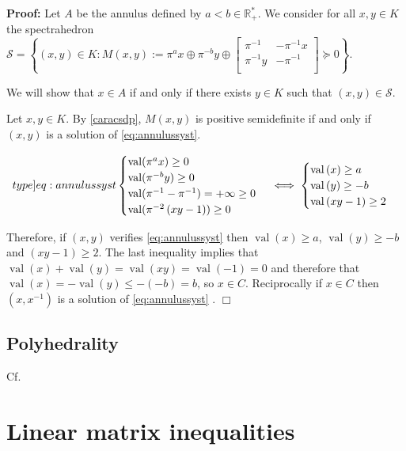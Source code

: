 \documentclass[a4paper,12pt]{article}
\newenvironment{proof}{\hbox{}\vspace{-0.8cm} {\bf Proof:}}{\hfill $\Box$}
\newcommand{\R}{\mathbb{R}} %
\DeclareMathOperator{\val}{val}
\begin{document}
\begin{proof}
Let $A$ be the annulus defined by $a<b \in \R^*_+$. We consider for all $x,y \in K $ the spectrahedron $\mathcal{S}= \left\{(x,y) \in K  : M(x,y) := \pi^ax \oplus \pi^{-b}y \oplus \begin{bmatrix} \pi^{-1} & -\pi^{-1}x \\ \pi^{-1}y & - \pi^{-1}  \\ \end{bmatrix} \succeq 0\right\}$.

We will show that $x \in A$ if and only if  there exists $y\in K$ such that $(x,y) \in \mathcal{S}$.

Let $x,y \in K$. By \ref{caracsdp}, $M(x,y)$ is positive semidefinite if and only if $(x,y)$ is a solution of \ref{eq:annulussyst}.


\begin{equation}
  \label[type]{eq:annulussyst}
\begin{cases}
  \val(\pi^ax) \ge 0 \\
  \val(\pi^{-b}y) \ge 0\\
  \val(\pi^{-1}- \pi^{-1}) = +\infty \ge 0\\
  \val(\pi^{-2}\left( xy-1 \right))  \ge 0 
\end{cases}
\iff	
\begin{cases} 
		\val\left(x\right)\ge a\\
		\val\left(y\right)\ge -b\\
		\val\left( xy-1 \right) \ge 2
	\end{cases}
\end{equation}




Therefore, if $(x, y)$ verifies \ref{eq:annulussyst} then $\val\left(x\right)\ge a$, $\val\left(y\right)\ge -b$ and $ \left( xy-1 \right) \ge 2$. The last inequality implies that $\val\left(x\right)+\val\left(y\right)=\val\left(xy\right) = \val\left(-1\right) =0$ and therefore that $\val\left(x\right)=-\val\left(y\right)\le -(-b)  =b$, so $x \in C$. 
Reciprocally if $x \in C$ then $(x,x^{-1}) $ is a solution of \ref{eq:annulussyst} .
\end{proof}

\subsection{Polyhedrality}
Cf. \cite{bhardwaj2015deciding}

\section{Linear matrix inequalities}
\end{document}
